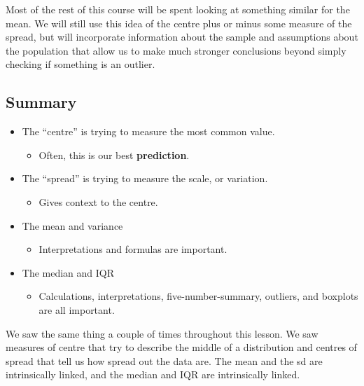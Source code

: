 \documentclass[
  letterpaper,
  DIV=11,
  numbers=noendperiod,
  oneside]{scrreprt}
\providecommand{\tightlist}{%
  \setlength{\itemsep}{0pt}\setlength{\parskip}{0pt}}\usepackage{longtable,booktabs,array}
\begin{document}
Most of the rest of this course will be spent looking at something
similar for the mean. We will still use this idea of the centre plus or
minus some measure of the spread, but will incorporate information about
the sample and assumptions about the population that allow us to make
much stronger conclusions beyond simply checking if something is an
outlier.

\hypertarget{summary-1}{%
\subsection{Summary}\label{summary-1}}

\begin{itemize}
\tightlist
\item
  The ``centre'' is trying to measure the most common value.

  \begin{itemize}
  \tightlist
  \item
    Often, this is our best \textbf{prediction}.
  \end{itemize}
\item
  The ``spread'' is trying to measure the scale, or variation.

  \begin{itemize}
  \tightlist
  \item
    Gives context to the centre.
  \end{itemize}
\item
  The mean and variance

  \begin{itemize}
  \tightlist
  \item
    Interpretations and formulas are important.
  \end{itemize}
\item
  The median and IQR

  \begin{itemize}
  \tightlist
  \item
    Calculations, interpretations, five-number-summary, outliers, and
    boxplots are all important.
  \end{itemize}
\end{itemize}

We saw the same thing a couple of times throughout this lesson. We saw
measures of centre that try to describe the middle of a distribution and
centres of spread that tell us how spread out the data are. The mean and
the sd are intrinsically linked, and the median and IQR are
intrinsically linked.
\end{document}
